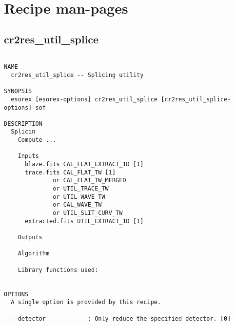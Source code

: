 \section{Recipe man-pages}\label{sec:manpages}
\subsection{cr2res\_util\_splice}
\begin{verbatim}

NAME
  cr2res_util_splice -- Splicing utility

SYNOPSIS
  esorex [esorex-options] cr2res_util_splice [cr2res_util_splice-options] sof

DESCRIPTION
  Splicin                                                                 
    Compute ...                                                           
                                                                          
    Inputs                                                                
      blaze.fits CAL_FLAT_EXTRACT_1D [1]               
      trace.fits CAL_FLAT_TW [1]                       
              or CAL_FLAT_TW_MERGED                    
              or UTIL_TRACE_TW                         
              or UTIL_WAVE_TW                          
              or CAL_WAVE_TW                           
              or UTIL_SLIT_CURV_TW                     
      extracted.fits UTIL_EXTRACT_1D [1]               
                                                                          
    Outputs                                                               
                                                                          
    Algorithm                                                             
                                                                          
    Library functions used:                                               
  

OPTIONS
  A single option is provided by this recipe.

  --detector            : Only reduce the specified detector. [0]

\end{verbatim}
